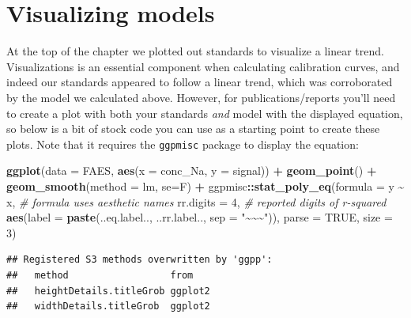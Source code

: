 \documentclass[
]{book}
\newenvironment{Shaded}{\begin{snugshade}}{\end{snugshade}}
\newcommand{\AttributeTok}[1]{\textcolor[rgb]{0.13,0.29,0.53}{#1}}
\newcommand{\CommentTok}[1]{\textcolor[rgb]{0.56,0.35,0.01}{\textit{#1}}}
\newcommand{\ConstantTok}[1]{\textcolor[rgb]{0.56,0.35,0.01}{#1}}
\newcommand{\DecValTok}[1]{\textcolor[rgb]{0.00,0.00,0.81}{#1}}
\newcommand{\FunctionTok}[1]{\textcolor[rgb]{0.13,0.29,0.53}{\textbf{#1}}}
\newcommand{\NormalTok}[1]{#1}
\newcommand{\SpecialCharTok}[1]{\textcolor[rgb]{0.81,0.36,0.00}{\textbf{#1}}}
\newcommand{\StringTok}[1]{\textcolor[rgb]{0.31,0.60,0.02}{#1}}
\begin{document}
\hypertarget{visualizing-models}{%
\section{Visualizing models}\label{visualizing-models}}

At the top of the chapter we plotted out standards to visualize a linear trend. Visualizations is an essential component when calculating calibration curves, and indeed our standards appeared to follow a linear trend, which was corroborated by the model we calculated above. However, for publications/reports you'll need to create a plot with both your standards \emph{and} model with the displayed equation, so below is a bit of stock code you can use as a starting point to create these plots. Note that it requires the \texttt{ggpmisc} package to display the equation:

\begin{Shaded}
\begin{Highlighting}[]
\FunctionTok{ggplot}\NormalTok{(}\AttributeTok{data =}\NormalTok{ FAES,}
       \FunctionTok{aes}\NormalTok{(}\AttributeTok{x =}\NormalTok{ conc\_Na, }
           \AttributeTok{y =}\NormalTok{ signal)) }\SpecialCharTok{+}
  \FunctionTok{geom\_point}\NormalTok{() }\SpecialCharTok{+}
  \FunctionTok{geom\_smooth}\NormalTok{(}\AttributeTok{method =} \StringTok{\textquotesingle{}lm\textquotesingle{}}\NormalTok{, }\AttributeTok{se=}\NormalTok{F) }\SpecialCharTok{+}
\NormalTok{  ggpmisc}\SpecialCharTok{::}\FunctionTok{stat\_poly\_eq}\NormalTok{(}\AttributeTok{formula =}\NormalTok{ y }\SpecialCharTok{\textasciitilde{}}\NormalTok{ x, }\CommentTok{\# formula uses aesthetic names}
                        \AttributeTok{rr.digits =} \DecValTok{4}\NormalTok{, }\CommentTok{\# reported digits of r{-}squared}
                        \FunctionTok{aes}\NormalTok{(}\AttributeTok{label =} \FunctionTok{paste}\NormalTok{(..eq.label.., ..rr.label.., }\AttributeTok{sep =} \StringTok{"\textasciitilde{}\textasciitilde{}\textasciitilde{}"}\NormalTok{)), }
                        \AttributeTok{parse =} \ConstantTok{TRUE}\NormalTok{, }\AttributeTok{size =} \DecValTok{3}\NormalTok{) }
\end{Highlighting}
\end{Shaded}

\begin{verbatim}
## Registered S3 methods overwritten by 'ggpp':
##   method                  from   
##   heightDetails.titleGrob ggplot2
##   widthDetails.titleGrob  ggplot2
\end{verbatim}
\end{document}
